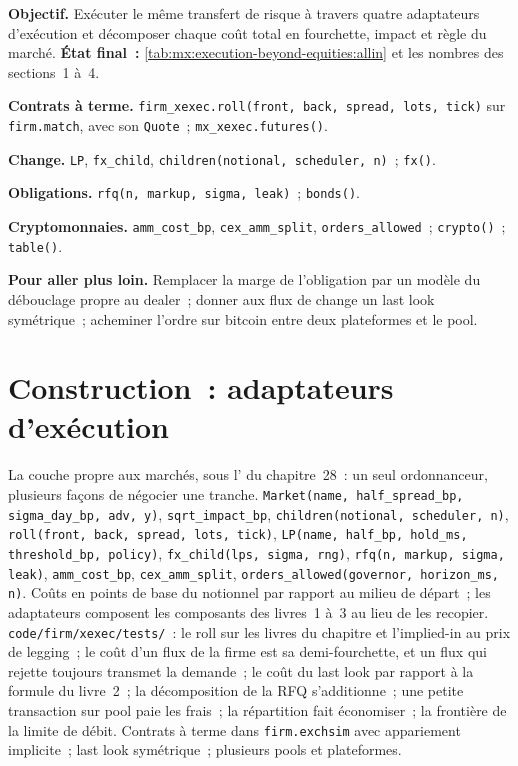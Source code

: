 \begin{tutorial}
\textbf{Objectif.} Exécuter le même transfert de risque à travers quatre adaptateurs d'exécution et décomposer chaque coût total en fourchette, impact et règle du marché.
\textbf{État final~:} \cref{tab:mx:execution-beyond-equities:allin} et les nombres des sections~1 à~4.
\begin{tutsteps}
\item \textbf{Contrats à terme.} \texttt{firm\_xexec.roll(front, back, spread, lots, tick)} sur \texttt{firm.match}, avec son \texttt{Quote}~; \texttt{mx\_xexec.futures()}.
\item \textbf{Change.} \texttt{LP}, \texttt{fx\_child}, \texttt{children(notional, scheduler, n)}~; \texttt{fx()}.
\item \textbf{Obligations.} \texttt{rfq(n, markup, sigma, leak)}~; \texttt{bonds()}.
\item \textbf{Cryptomonnaies.} \texttt{amm\_cost\_bp}, \texttt{cex\_amm\_split}, \texttt{orders\_allowed}~; \texttt{crypto()}~; \texttt{table()}.
\end{tutsteps}
\textbf{Pour aller plus loin.} Remplacer la marge de l'obligation par un modèle du débouclage propre au dealer~; donner aux flux de change un last look symétrique~; acheminer
l'ordre sur bitcoin entre deux plateformes et le pool.
\end{tutorial}

\section{Construction~: adaptateurs d'exécution}\label{bld:mx:execution-beyond-equities:xexec}

\begin{build}
 La couche propre aux marchés, sous l' du chapitre~28~: un seul ordonnanceur, plusieurs façons de négocier une tranche.
 \texttt{Market(name, half\_spread\_bp, sigma\_day\_bp, adv, y)}, \texttt{sqrt\_impact\_bp},
\texttt{children(notional, scheduler, n)}, \texttt{roll(front, back, spread, lots, tick)}, \texttt{LP(name, half\_bp, hold\_ms, threshold\_bp, policy)},
\texttt{fx\_child(lps, sigma, rng)}, \texttt{rfq(n, markup, sigma, leak)}, \texttt{amm\_cost\_bp}, \texttt{cex\_amm\_split},
\texttt{orders\_allowed(governor, horizon\_ms, n)}.
 Coûts en points de base du notionnel par rapport au milieu de départ~; les adaptateurs composent les composants des livres~1 à~3 au lieu de les recopier.
 \texttt{code/firm/xexec/tests/}~: le roll sur les livres du chapitre et l'implied-in au prix de legging~; le coût d'un flux de la firme
est sa demi-fourchette, et un flux qui rejette toujours transmet la demande~; le coût du last look par rapport à la formule du livre~2~; la décomposition de la RFQ s'additionne~; une petite
transaction sur pool paie les frais~; la répartition fait économiser~; la frontière de la limite de débit.
 Contrats à terme dans \texttt{firm.exchsim} avec appariement implicite~; last look symétrique~; plusieurs pools et plateformes.
\end{build}

